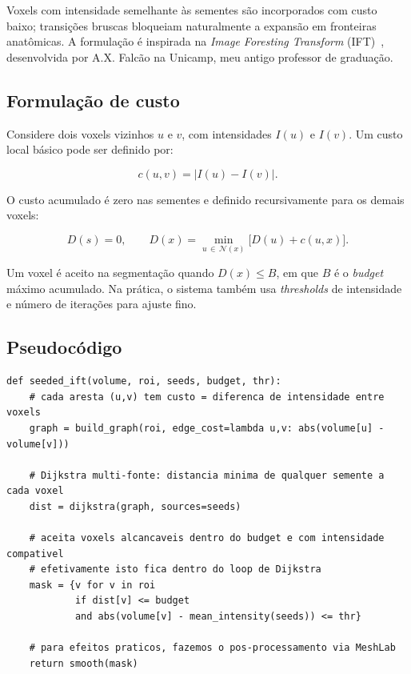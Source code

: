 \documentclass[12pt,a4paper]{article}
\begin{document}
Voxels com intensidade semelhante às sementes são incorporados com custo baixo; transições bruscas bloqueiam naturalmente a expansão em fronteiras anatômicas. A formulação é inspirada na \textit{Image Foresting Transform} (IFT)~\cite{falcao2004}, desenvolvida por A.X. Falcão na Unicamp, meu antigo professor de graduação.

\subsection{Formulação de custo}

Considere dois voxels vizinhos $u$ e $v$, com intensidades $I(u)$ e $I(v)$. Um custo local básico pode ser definido por:

\begin{equation}
c(u,v) = |I(u)-I(v)|.
\end{equation}

O custo acumulado é zero nas sementes e definido recursivamente para os demais voxels:

\begin{equation}
D(s) = 0, \qquad D(x) = \min_{u \,\in\, \mathcal{N}(x)}\bigl[D(u) + c(u,x)\bigr].
\end{equation}

Um voxel é aceito na segmentação quando $D(x) \leq B$, em que $B$ é o \textit{budget} máximo acumulado. Na prática, o sistema também usa \textit{thresholds} de intensidade e número de iterações para ajuste fino.

\subsection{Pseudocódigo}

\begin{algorithm}[H]
\caption{Seeded IFT — segmentação por sementes com custo acumulado}
\begin{lstlisting}[style=pseudopy]
def seeded_ift(volume, roi, seeds, budget, thr):
    # cada aresta (u,v) tem custo = diferenca de intensidade entre voxels
    graph = build_graph(roi, edge_cost=lambda u,v: abs(volume[u] - volume[v]))

    # Dijkstra multi-fonte: distancia minima de qualquer semente a cada voxel
    dist = dijkstra(graph, sources=seeds)

    # aceita voxels alcancaveis dentro do budget e com intensidade compativel
    # efetivamente isto fica dentro do loop de Dijkstra
    mask = {v for v in roi
            if dist[v] <= budget
            and abs(volume[v] - mean_intensity(seeds)) <= thr}

    # para efeitos praticos, fazemos o pos-processamento via MeshLab        
    return smooth(mask)
\end{lstlisting}
\end{algorithm}
\end{document}
